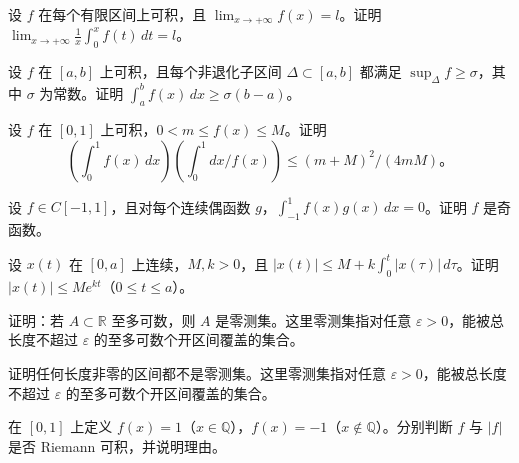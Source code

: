 \noindent\begin{minipage}{\textwidth}
设 $f$ 在每个有限区间上可积，且 $\lim_{x\to+\infty}f(x)=l$。证明 $\lim_{x\to+\infty}\frac1x\int_0^x f(t)\,dt=l$。
\end{minipage}\par\vfill
\newpage
\noindent\begin{minipage}{\textwidth}
设 $f$ 在 $[a,b]$ 上可积，且每个非退化子区间 $\Delta\subset[a,b]$ 都满足 $\sup_\Delta f\ge\sigma$，其中 $\sigma$ 为常数。证明 $\int_a^b f(x)\,dx\ge\sigma(b-a)$。
\end{minipage}\par\vfill
\noindent\begin{minipage}{\textwidth}
设 $f$ 在 $[0,1]$ 上可积，$0<m\le f(x)\le M$。证明 \[(\int_0^1f(x)\,dx)(\int_0^1dx/f(x))\le(m+M)^2/(4mM)\text{。}\]
\end{minipage}\par\vfill
\noindent\begin{minipage}{\textwidth}
设 $f\in C[-1,1]$，且对每个连续偶函数 $g$，$\int_{-1}^1 f(x)g(x)\,dx=0$。证明 $f$ 是奇函数。
\end{minipage}\par\vfill
\newpage
\noindent\begin{minipage}{\textwidth}
设 $x(t)$ 在 $[0,a]$ 上连续，$M,k>0$，且 $|x(t)|\le M+k\int_0^t|x(\tau)|\,d\tau$。证明 $|x(t)|\le Me^{kt}$（$0\le t\le a$）。
\end{minipage}\par\vfill
\noindent\begin{minipage}{\textwidth}
证明：若 $A\subset\mathbb R$ 至多可数，则 $A$ 是零测集。这里零测集指对任意 $\varepsilon>0$，能被总长度不超过 $\varepsilon$ 的至多可数个开区间覆盖的集合。
\end{minipage}\par\vfill
\noindent\begin{minipage}{\textwidth}
证明任何长度非零的区间都不是零测集。这里零测集指对任意 $\varepsilon>0$，能被总长度不超过 $\varepsilon$ 的至多可数个开区间覆盖的集合。
\end{minipage}\par\vfill
\newpage
\noindent\begin{minipage}{\textwidth}
在 $[0,1]$ 上定义 $f(x)=1$（$x\in\mathbb Q$），$f(x)=-1$（$x\notin\mathbb Q$）。分别判断 $f$ 与 $|f|$ 是否 Riemann 可积，并说明理由。
\end{minipage}\par\vfill
